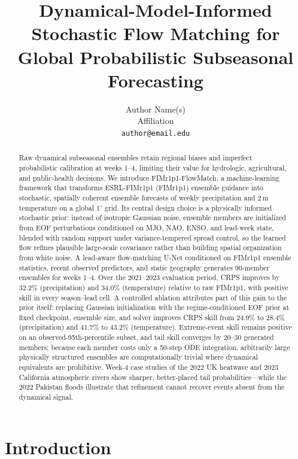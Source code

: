 \documentclass[11pt]{article}
\title{Dynamical-Model-Informed Stochastic Flow Matching for Global Probabilistic Subseasonal Forecasting}
\author{Author Name(s)\\Affiliation\\\texttt{author@email.edu}}
\date{}
\newcommand{\modelname}{ESRL-FIMr1p1}
\newcommand{\modelshort}{FIMr1p1}
\newcommand{\methodname}{\modelshort{}-FlowMatch}
\begin{document}
\maketitle

\begin{abstract}
Raw dynamical subseasonal ensembles retain regional biases and imperfect probabilistic calibration at weeks 1--4, limiting their value for hydrologic, agricultural, and public-health decisions. We introduce \methodname{}, a machine-learning framework that transforms \modelname{} (\modelshort{}) ensemble guidance into stochastic, spatially coherent ensemble forecasts of weekly precipitation and 2\,m temperature on a global $1^\circ$ grid. Its central design choice is a physically informed stochastic prior: instead of isotropic Gaussian noise, ensemble members are initialized from EOF perturbations conditioned on MJO, NAO, ENSO, and lead-week state, blended with random support under variance-tempered spread control, so the learned flow refines plausible large-scale covariance rather than building spatial organization from white noise. A lead-aware flow-matching U-Net conditioned on \modelshort{} ensemble statistics, recent observed predictors, and static geography generates 90-member ensembles for weeks 1--4. Over the 2021--2023 evaluation period, CRPS improves by 32.2\% (precipitation) and 34.0\% (temperature) relative to raw \modelshort{}, with positive skill in every season--lead cell. A controlled ablation attributes part of this gain to the prior itself: replacing Gaussian initialization with the regime-conditioned EOF prior at fixed checkpoint, ensemble size, and solver improves CRPS skill from 24.9\% to 28.4\% (precipitation) and 41.7\% to 43.2\% (temperature). Extreme-event skill remains positive on an observed-95th-percentile subset, and tail skill converges by 20--30 generated members; because each member costs only a 50-step ODE integration, arbitrarily large physically structured ensembles are computationally trivial where dynamical equivalents are prohibitive. Week-4 case studies of the 2022 UK heatwave and 2023 California atmospheric rivers show sharper, better-placed tail probabilities---while the 2022 Pakistan floods illustrate that refinement cannot recover events absent from the dynamical signal.
\end{abstract}

\section{Introduction}
\label{sec:intro}
\end{document}
